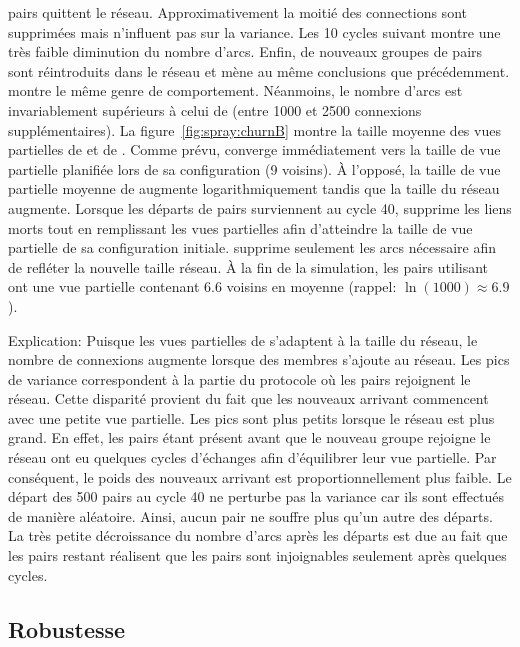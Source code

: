 \begin{asparadesc}
  pairs quittent le réseau. Approximativement la moitié des connections sont
  supprimées mais n'influent pas sur la variance. Les 10 cycles suivant montre
  une très faible diminution du nombre d'arcs. Enfin, de nouveaux groupes de
  pairs sont réintroduits dans le réseau et mène au même conclusions que
  précédemment. \CYCLON montre le même genre de comportement. Néanmoins, le
  nombre d'arcs est invariablement supérieurs à celui de \SPRAY (entre 1000 et
  2500 connexions supplémentaires). La figure~\ref{fig:spray:churnB} montre la
  taille moyenne des vues partielles de \SPRAY et de \CYCLON. Comme prévu,
  \CYCLON converge immédiatement vers la taille de vue partielle planifiée lors
  de sa configuration (9 voisins). À l'opposé, la taille de vue partielle
  moyenne de \SPRAY augmente logarithmiquement tandis que la taille du réseau
  augmente. Lorsque les départs de pairs surviennent au cycle 40, \CYCLON
  supprime les liens morts tout en remplissant les vues partielles afin
  d'atteindre la taille de vue partielle de sa configuration initiale. \SPRAY
  supprime seulement les arcs nécessaire afin de refléter la nouvelle taille
  réseau. À la fin de la simulation, les pairs utilisant \SPRAY ont une vue
  partielle contenant 6.6 voisins en moyenne (rappel: $\ln(1000)\approx 6.9$).
\item [Explication:] Puisque les vues partielles de \SPRAY s'adaptent à la
  taille du réseau, le nombre de connexions augmente lorsque des membres
  s'ajoute au réseau. Les pics de variance correspondent à la partie du
  protocole où les pairs rejoignent le réseau. Cette disparité provient du fait
  que les nouveaux arrivant commencent avec une petite vue partielle. Les pics
  sont plus petits lorsque le réseau est plus grand. En effet, les pairs étant
  présent avant que le nouveau groupe rejoigne le réseau ont eu quelques cycles
  d'échanges afin d'équilibrer leur vue partielle. Par conséquent, le poids des
  nouveaux arrivant est proportionnellement plus faible. Le départ des 500 pairs
  au cycle 40 ne perturbe pas la variance car ils sont effectués de manière
  aléatoire. Ainsi, aucun pair ne souffre plus qu'un autre des départs. La très
  petite décroissance du nombre d'arcs après les départs est due au fait que les
  pairs restant réalisent que les pairs sont injoignables seulement après
  quelques cycles. 
\end{asparadesc}

\subsection{Robustesse}

